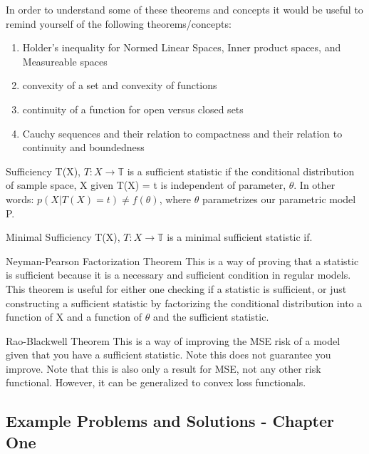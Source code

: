     In order to understand some of these theorems and concepts it would be useful to remind yourself of the following theorems/concepts:

    \begin{enumerate}
      \item Holder's inequality for Normed Linear Spaces, Inner product spaces, and Measureable spaces
      \item convexity of a set and convexity of functions
      \item continuity of a function for open versus closed sets
      \item Cauchy sequences and their relation to compactness and their relation to continuity and boundedness
    \end{enumerate}

    \begin{definition}{Sufficiency}
    T(X), $T: X \rightarrow \mathbb{T}$ is a sufficient statistic if the conditional distribution of sample space, X given T(X) = t is independent of parameter, $\theta$. In other words: $p(X | T(X) = t) \neq f(\theta)$, where $\theta$ parametrizes our parametric model P. 
    \end{definition}

    \begin{definition}{Minimal Sufficiency}
    T(X), $T: X \rightarrow \mathbb{T}$ is a minimal sufficient statistic if.
    \end{definition}

    \begin{theorem}{Neyman-Pearson Factorization Theorem}
    This is a way of proving that a statistic is sufficient because it is a necessary and sufficient condition in regular models. This theorem is useful for either one checking if a statistic is sufficient, or just constructing a sufficient statistic by factorizing the conditional distribution into a function of X and a function of $\theta$ and the sufficient statistic.
    \end{theorem}

    \begin{theorem}{Rao-Blackwell Theorem}
    This is a way of improving the MSE risk of a model given that you have a sufficient statistic. Note this does not guarantee you improve. Note that this is also only a result for MSE, not any other risk functional. However, it can be generalized to convex loss functionals.
    \end{theorem}

  \subsection{Example Problems and Solutions - Chapter One}

